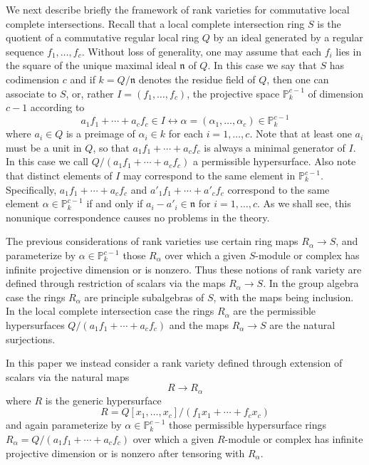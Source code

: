 \documentclass{amsart}[11pt]
\newcommand{\n}{{\mathfrak n}}
\numberwithin{equation}{section}
\theoremstyle{plain}
\newtheorem*{Main Theorem}{Main Theorem}
\theoremstyle{definition}
\theoremstyle{remark}
\numberwithin{equation}{theorem}
\begin{document}
We next describe briefly the framework of rank varieties for commutative local complete intersections.
Recall that a local complete intersection ring 
$S$ is the quotient of a commutative regular local ring $Q$ by an ideal generated by a regular sequence $f_1,\dots,f_c$. Without loss of generality, one may assume that each $f_i$ lies in the square of the unique maximal ideal $\n$ of $Q$.  In this case we say that $S$ has codimension $c$ and if $k=Q/\n$ denotes the residue field of $Q$, then one can associate to $S$, or, rather $I=(f_1,\dots,f_c)$, the projective space $\mathbb P^{c-1}_k$ of dimension 
$c-1$ according to 
\[
a_1f_1+\cdots +a_cf_c\in I \leftrightarrow \alpha=(\alpha_1,\dots,\alpha_c)\in\mathbb P^{c-1}_k
\]
where $a_i\in Q$ is a preimage of $\alpha_i\in k$ for each $i=1,\dots,c$. Note that at least one 
$a_i$ must be a unit in $Q$, so that $a_1f_1+\cdots +a_cf_c$ is always a minimal generator of $I$.  In this case we call $Q/(a_1f_1+\cdots +a_cf_c)$ a permissible hypersurface. Also note that distinct elements of $I$ may correspond to the same element in $\mathbb P^{c-1}_k$. Specifically, $a_1f_1+\cdots +a_cf_c$ and $a'_1f_1+\cdots +a'_cf_c$ correspond to the same element 
$\alpha\in\mathbb P^{c-1}_k$ if and only if $a_i-a'_i\in\n$ for $i=1,\dots,c$. As we shall see, this nonunique correspondence causes no problems in the theory.

The previous considerations of rank varieties use certain ring maps $R_\alpha\to S$, and parameterize by $\alpha\in\mathbb P^{c-1}_k$ those $R_\alpha$ over which a given $S$-module or complex has infinite projective dimension or is nonzero. Thus these notions of rank variety are defined through restriction of scalars via the maps $R_\alpha\to S$. In the group algebra case the rings $R_\alpha$ are principle subalgebras of $S$, with the maps being inclusion. In the local complete intersection case the rings $R_\alpha$ are the permissible hypersurfaces $Q/(a_1f_1+\cdots+a_cf_c)$ and the maps 
$R_\alpha\to S$ are the natural surjections.

In this paper we instead consider a rank variety defined through extension of scalars via the natural
maps
\[
R \to R_\alpha 
\]
where $R$ is the generic hypersurface 
\[
R=Q[x_1,\dots,x_c]/(f_1x_1+\cdots+f_cx_c)
\] 
and again parameterize by $\alpha\in\mathbb P^{c-1}_k$ those permissible hypersurface rings 
$R_\alpha=Q/(a_1f_1+\cdots+a_cf_c)$ over which a given $R$-module or complex has infinite projective dimension or is nonzero after tensoring with $R_\alpha$.  
\end{document}
